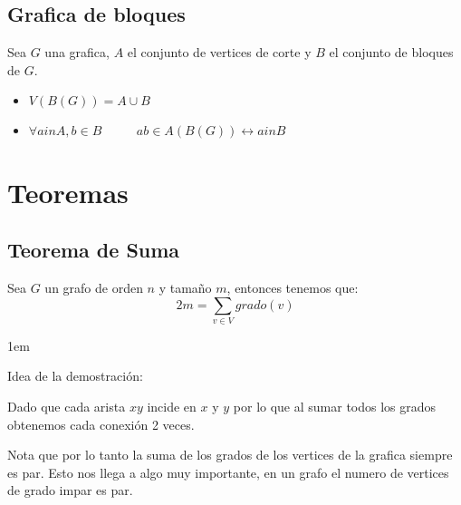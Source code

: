 \documentclass[12pt, fleqn]{report}                             %
\newenvironment{SmallIndentation}[1][0.75em]                    %
        {\begin{adjustwidth}{#1}{}\begin{footnotesize}}             %
        {\end{footnotesize}\end{adjustwidth}}                       %
\DeclareMathOperator \MegaSpace {\quad \quad}                   %
\theoremstyle{break}                                            %
\newcommand \lIff    {\leftrightarrow}                          %
\begin{document}
            \subsection{Grafica de bloques}

                Sea $G$ una grafica, $A$ el conjunto de vertices de corte
                y $B$ el conjunto de bloques de $G$.

                \begin{itemize}
                    \item $V(B(G)) = A \cup B$
                    \item $\forall a in A, b \in B \MegaSpace ab \in A(B(G)) \lIff a in B$
                \end{itemize}


        \clearpage
        \section{Teoremas}

            \subsection{Teorema de Suma}

                Sea $G$ un grafo de orden $n$ y tamaño $m$, entonces tenemos que:
                \begin{equation*}
                    2m = \sum_{v \in V}{grado(v)}
                \end{equation*}

                \begin{SmallIndentation}[1em]
                    Idea de la demostración:
                    
                    Dado que cada arista $xy$ incide en $x$ y $y$ por lo que al sumar todos los grados obtenemos cada conexión
                    2 veces.
                \end{SmallIndentation}

                Nota que por lo tanto la suma de los grados de los vertices de la grafica siempre es par.
                Esto nos llega a algo muy importante, en un grafo el numero de vertices de grado impar es par.
                
\end{document}
